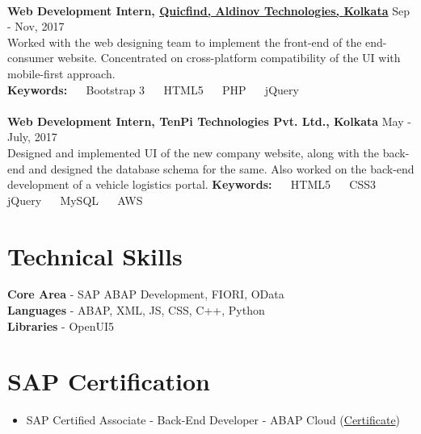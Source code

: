 \documentclass[margin, centered, a4paper]{res}
\begin{document}
\begin{resume}
\\
\textbf{Web Development Intern, \href{http://www.quicfind.com}{Quicfind, Aldinov Technologies, Kolkata}} \hfill Sep - Nov, 2017\\
Worked with the web designing team to implement the front-end of the end-consumer website. Concentrated on cross-platform compatibility of the UI with mobile-first approach.\\
\textbf{Keywords:} ~\textbullet~ Bootstrap 3 ~\textbullet~ HTML5 ~\textbullet~ PHP ~\textbullet~ jQuery\\
\\
\textbf{Web Development Intern, TenPi Technologies Pvt. Ltd., Kolkata} \hfill May - July, 2017\\
Designed and implemented UI of the new company website, along with the back-end and designed the database schema for the same. Also worked on the back-end development of a vehicle logistics portal.
\textbf{Keywords:} ~\textbullet~ HTML5 ~\textbullet~ CSS3 ~\textbullet~ jQuery ~\textbullet~ MySQL ~\textbullet~ AWS

\section{Technical Skills}
\textbf{Core Area} - SAP ABAP Development, FIORI, OData\\
\textbf{Languages} - ABAP, XML, JS, CSS, C++, Python\\
\textbf{Libraries} - OpenUI5

\section{SAP Certification}
\begin{itemize}[leftmargin=*]
	\item SAP Certified Associate - Back-End Developer - ABAP Cloud (\href{https://www.credly.com/badges/5c9d9064-66b4-42b4-bb43-40fef83b41f8/public_url}{Certificate})
\end{itemize}


\end{resume}
\end{document}
